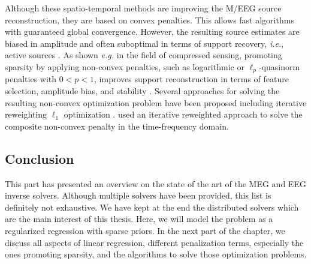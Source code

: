 Although these spatio-temporal methods are improving the M/EEG source reconstruction, they are based on convex penalties. This allows fast algorithms with guaranteed global convergence. However, the resulting source estimates are biased in amplitude and often suboptimal in terms of support recovery, \textit{i.e.}, active sources \cite{candes2008enhancing}. As shown \textit{e.g.} in the field of compressed sensing, promoting sparsity by applying non-convex penalties, such as logarithmic or  $\ell_p$-quasinorm penalties with $0<p<1$, improves support reconstruction in terms of feature selection, amplitude bias, and stability \cite{candes2008enhancing,chartrand2007exact,saab2008stable}. Several approaches for solving the resulting non-convex optimization problem have been proposed including iterative reweighting $\ell_1$ optimization \cite{candes2008enhancing}. \cite{strohmeier2014iterative} used an iterative reweighted approach to solve the composite non-convex penalty in the time-frequency domain.






\subsection{Conclusion}
This part has presented an overview on the state of the art of the MEG and EEG inverse solvers. Although multiple solvers have been provided, this list is definitely not exhaustive.
We have kept at the end the distributed solvers which are the main interest of this thesis. Here, we will model the problem as a regularized regression with sparse priors. In the next part of the chapter, we discuss all aspects of linear regression, different penalization terms, especially the ones promoting sparsity, and the algorithms to solve those optimization problems.

